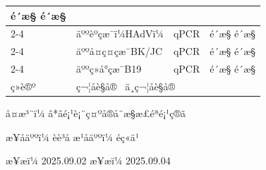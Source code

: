 \documentclass[UTF8,10pt,a4paper,fontset=fandol]{ctexart}
\newcommand{\fieldvalue}[1]{#1}
\newcommand{\handwritten}[1]{#1}
\begin{document}
\begin{tabularx}{\textwidth}{|p{2.2cm}|X|p{2.0cm}|X|}
\fieldvalue{é´æ§}
\quad
\fieldvalue{é´æ§}
\\ \cline{2-4}
&
\fieldvalue{äººèºçæ¯ï¼HAdVï¼}
&
\fieldvalue{qPCR}
&
\fieldvalue{é´æ§}
\quad
\fieldvalue{é´æ§}
\\ \cline{2-4}
&
\fieldvalue{äººå¤ç¤çæ¯BK/JC}
&
\fieldvalue{qPCR}
&
\fieldvalue{é´æ§}
\quad
\fieldvalue{é´æ§}
\\ \cline{2-4}
&
\fieldvalue{äººç»å°çæ¯B19}
&
\fieldvalue{qPCR}
&
\fieldvalue{é´æ§}
\quad
\fieldvalue{é´æ§}
\\ \hline
ç»è®º &
\multicolumn{3}{l|}{
ç¬¦åè§å® \qquad
\fieldvalue{\handwritten{\checkmark}}\ ä¸ç¬¦åè§å®
}
\\ \hline
\end{tabularx}

\medskip

å¤æ³¨ï¼ â*âé¡¹è¡¨ç¤ºå®å¨æ§æ£éªé¡¹ç®ã

\begin{flushleft}
æ¥åäººï¼
\fieldvalue{\handwritten{èè³å}}
\hfill
æ¹åäººï¼
\fieldvalue{\handwritten{é­ç«ä¹}}
\end{flushleft}

\begin{flushleft}
æ¥\quad æï¼
\fieldvalue{\handwritten{2025.09.02}}
\hfill
æ¥\quad æï¼
\fieldvalue{\handwritten{2025.09.04}}
\end{flushleft}
\end{document}
